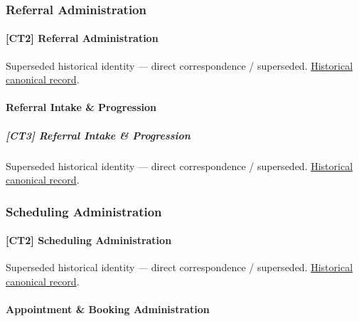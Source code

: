 \subsubsection{Referral Administration}

\paragraph{[CT2] Referral Administration}

\par\label{element:5b0ccf4b30054145952c298b348ed266}
Superseded historical identity — direct correspondence / superseded. \href{../../../../continuum/strategy/capability/5b0ccf4b30054145952c298b348ed266.md}{Historical canonical record}.\par

\paragraph{Referral Intake \& Progression}

\subparagraph{[CT3] Referral Intake \& Progression}

\par\label{element:7180f6265d5c4687a001220c6126e301}
Superseded historical identity — direct correspondence / superseded. \href{../../../../continuum/strategy/capability/7180f6265d5c4687a001220c6126e301.md}{Historical canonical record}.\par

\subsubsection{Scheduling Administration}

\paragraph{[CT2] Scheduling Administration}

\par\label{element:1a6630940ffb44fcad4543b93a367b67}
Superseded historical identity — direct correspondence / superseded. \href{../../../../continuum/strategy/capability/1a6630940ffb44fcad4543b93a367b67.md}{Historical canonical record}.\par

\paragraph{Appointment \& Booking Administration}

